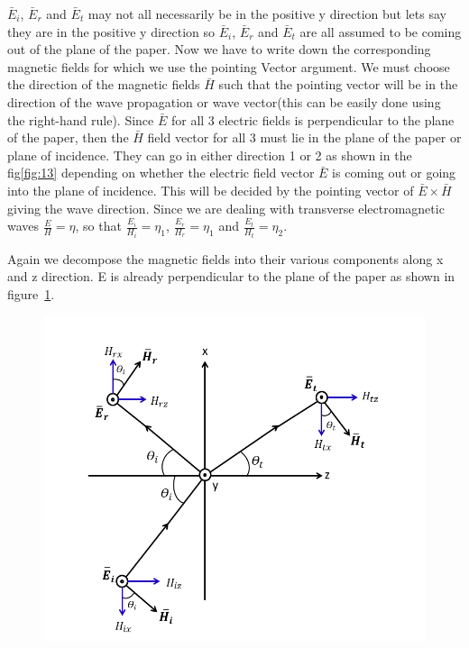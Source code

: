$\bar{E}_{i}$, $\bar{E}_{r}$ and  $\bar{E}_{t}$ may not all necessarily be in the positive y direction but lets say they are in the positive y direction so  $\bar{E}_{i}$,  $\bar{E}_{r}$ and  $\bar{E}_{t}$ are all assumed to be coming out of the plane of the paper. Now we have to write down the corresponding magnetic fields for which we use the pointing Vector argument. We must choose the direction of the magnetic fields $\bar{H}$ such that the pointing vector will be in the direction of the wave propagation or wave vector(this can be easily done using the right-hand rule). Since $\bar{E}$ for all 3 electric fields is perpendicular to the plane of the paper, then the $\bar{H}$ field vector for all 3 must lie in the plane of the paper or plane of incidence. They can go in  either direction 1 or 2 as shown in the fig\ref{fig:13} depending on whether the electric field vector $\bar{E}$ is coming out or going into the plane of incidence. This will be decided by the pointing vector of  $\bar{E} \times \bar{H}$ giving the wave direction. Since we are dealing with transverse electromagnetic waves $\frac{E}{H} = \eta$, so that $\frac{E_{i}}{H_{i}} = \eta_{1}$, $\frac{E_{r}}{H_{r}} = \eta_{1}$ and  $\frac{E_{t}}{H_{t}} = \eta_{2}$.

Again we decompose the magnetic fields into their various components along x and z direction. E is already perpendicular to the plane of the paper as shown in figure~\ref{fig:14}.
\begin{figure}[h]
\centering
\includegraphics[width=1.2\linewidth]{./graphics/perpendicular_polarization3}
\caption{}
\label{fig:14}
\end{figure}

